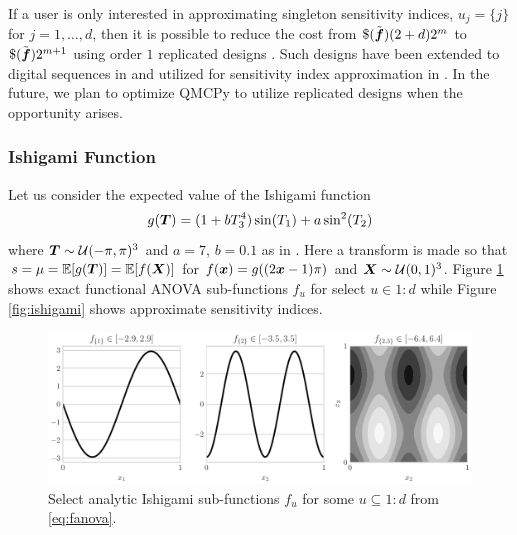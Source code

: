 \documentclass{article}[12pt]
\begin{document}
If a user is only interested in approximating singleton sensitivity indices, $u_j = \{j\}$ for $j=1,\dots,d$, then it is possible to reduce the cost from $\$(\tilde{\bf})(2+d)2^m$ to $\$(\tilde{\bf})2^{m+1}$ using order $1$ replicated designs \cite{alex2008comparison,tissot2015randomized}. Such designs have been extended to  digital sequences in \cite{replicated_designs_sobol_seq} and utilized for sensitivity index approximation in \cite{reliable_sobol_indices_approx}. In the future, we plan to optimize QMCPy to utilize replicated designs when the opportunity arises.

\subsubsection{Ishigami Function}

Let us consider the expected value of the Ishigami function \cite{ishigami1990importance}
\begin{equation}
    g(\bT) = (1+bT_3^4)\sin(T_1)+a\sin^2(T_2)
    \label{eq:ishigami}
\end{equation}
where $\bT \sim \calU(-\pi,\pi)^3$ and $a=7$, $b=0.1$ as in \cite{crestaux2007polynomial,marrel2009calculations}. Here a transform is made so that $s = \mu = \bbE[g(\bT)]=\bbE[f(\bX)]$ for $f(\bx) = g((2\bx-1)\pi)$ and $\bX \sim \calU(0,1)^3$.  Figure \ref{fig:ishigami_fu} shows exact functional ANOVA sub-functions $f_u$ for select $u \in 1:d$ while Figure \ref{fig:ishigami} shows approximate sensitivity indices.

\begin{figure}[t]
    \centering
    \includegraphics[width=.8\textwidth]{figs/ishigami_fu.pdf}
    \caption{Select analytic Ishigami sub-functions $f_u$ for some $u \subseteq 1:d$ from \eqref{eq:fanova}.}
    \label{fig:ishigami_fu}
\end{figure}
\end{document}
